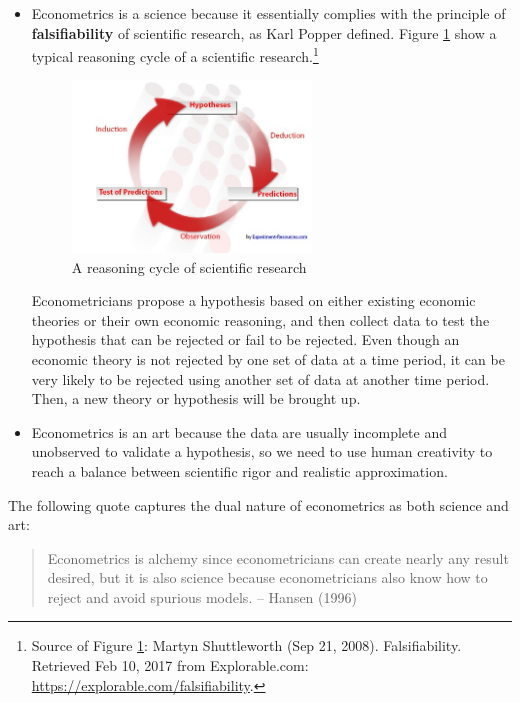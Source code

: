 \documentclass[a4paper,11pt]{article}
\begin{document}
\begin{itemize}
\item Econometrics is a science because it essentially complies with the
principle of \textbf{falsifiability} of scientific research, as Karl Popper
defined. Figure \ref{fig:org810b5e4} show a typical reasoning cycle
of a scientific research.\footnote{Source of Figure \ref{fig:org810b5e4}: Martyn Shuttleworth (Sep
21, 2008). Falsifiability. Retrieved Feb 10, 2017 from Explorable.com:
\url{https://explorable.com/falsifiability}.}

\begin{figure}[htbp]
\centering
\includegraphics[width=0.6\textwidth]{figure/reasoning-cycle-research.jpg}
\caption{\label{fig:org810b5e4}
A reasoning cycle of scientific research}
\end{figure}

Econometricians propose a hypothesis based on either existing economic
theories or their own economic reasoning, and then collect data to
test the hypothesis that can be rejected or fail to be rejected. Even
though an economic theory is not rejected by one set of data at a
time period, it can be very likely to be rejected using another set of
data at another time period. Then, a new theory or hypothesis will
be brought up.

\item Econometrics is an art because the data are usually incomplete and
unobserved to validate a hypothesis, so we need to use human
creativity to reach a balance between scientific rigor and realistic
approximation.
\end{itemize}

The following quote captures the dual nature of econometrics as both
science and art:
\begin{quote}
Econometrics is alchemy since econometricians can create nearly any
result desired, but it is also science because econometricians also
know how to reject and avoid spurious models. -- Hansen (1996)
\end{quote}
\end{document}
